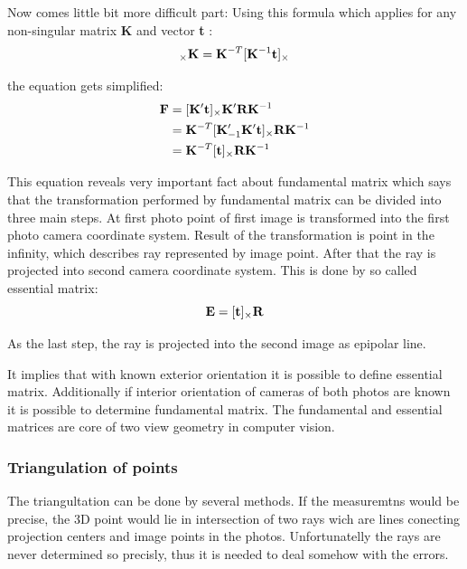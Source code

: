 \documentclass[a4paper,12pt]{report}
\newcommand{\ematr}[1]{
{\bf #1}
}
\newcommand{\evect}[1]{
{\bf #1}
}
\begin{document}
Now comes little bit more difficult part:
Using this formula which applies for any non-singular matrix \ematr{K} and vector \evect{t}:
\begin{equation}
[\evect{t}]_{\times} \ematr{K} = \ematr{K}^{-T}[\ematr{K}^{-1}\evect{t}]_{\times}
\end{equation}

the equation gets simplified:
\begin{equation}
\begin{split}
\ematr{F}  &= [\ematr{K}' \evect{t}]_{\times} \ematr{K}' \ematr{R} \ematr{K}^{-1} \\
	   &= \ematr{K}^{-T} [\ematr{K}'_{-1} \ematr{K}' \evect{t}]_{\times} \ematr{R} \ematr{K}^{-1} \\
	   &= \ematr{K}^{-T} [\evect{t}]_{\times} \ematr{R} \ematr{K}^{-1}
\end{split}
\end{equation}

This equation reveals very important fact about fundamental matrix which says that the transformation performed 
by fundamental matrix can be divided into three main steps.
At first photo point of first image is transformed into the first photo camera coordinate system. Result of the transformation is 
point in the infinity, which describes ray represented by image point. 
After that the ray is projected into second camera coordinate system. This is done by so called essential matrix:
\begin{equation}
	 \ematr{E}  = [\evect{t}]_{\times} \ematr{R}
\end{equation}


As the last step, the ray is projected into the second image as epipolar line.


It implies that with known exterior orientation it is possible to define essential matrix. 
Additionally if interior orientation of cameras of both photos are known it is possible to determine fundamental matrix. 
The fundamental and essential matrices are core of two view geometry in computer vision.

\subsubsection{Triangulation of points}



The triangultation can be done by several methods. If the measuremtns would be precise, the 3D point 
would lie in intersection of two rays wich are lines conecting projection centers and image points 
in the photos. Unfortunatelly the rays are never determined so precisly, thus it is needed to deal 
somehow with the errors. 
\end{document}

